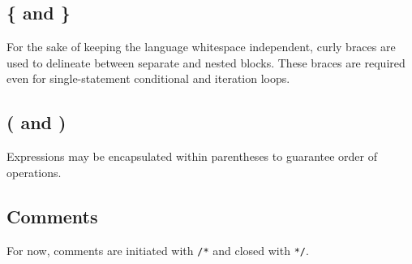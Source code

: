 		\subsection{\{ and \}}
			For the sake of keeping the language whitespace independent, curly braces are used to delineate between separate and nested blocks. These braces are required even for single-statement conditional and iteration loops. 
		\subsection{( and )}
			Expressions may be encapsulated within parentheses to guarantee order of operations. 
		\subsection{Comments}
			For now, comments are initiated with \texttt{/*} and closed with \texttt{*/}. 

			
			
			